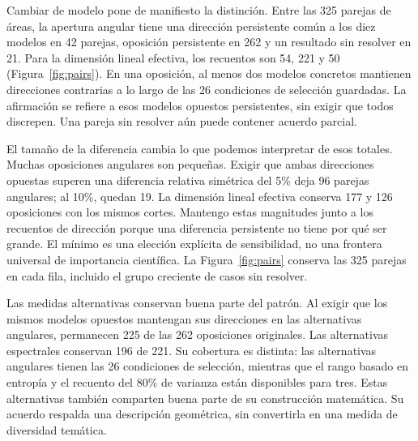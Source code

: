 \documentclass[12pt]{article}
\begin{document}
Cambiar de modelo pone de manifiesto la distinción. Entre las 325 parejas de áreas, la apertura angular tiene una dirección persistente común a los diez modelos en 42 parejas, oposición persistente en 262 y un resultado sin resolver en 21. Para la dimensión lineal efectiva, los recuentos son 54, 221 y 50 (Figura~\ref{fig:pairs}). En una oposición, al menos dos modelos concretos mantienen direcciones contrarias a lo largo de las 26 condiciones de selección guardadas. La afirmación se refiere a esos modelos opuestos persistentes, sin exigir que todos discrepen. Una pareja sin resolver aún puede contener acuerdo parcial.

El tamaño de la diferencia cambia lo que podemos interpretar de esos totales. Muchas oposiciones angulares son pequeñas. Exigir que ambas direcciones opuestas superen una diferencia relativa simétrica del 5\% deja 96 parejas angulares; al 10\%, quedan 19. La dimensión lineal efectiva conserva 177 y 126 oposiciones con los mismos cortes. Mantengo estas magnitudes junto a los recuentos de dirección porque una diferencia persistente no tiene por qué ser grande. El mínimo es una elección explícita de sensibilidad, no una frontera universal de importancia científica. La Figura~\ref{fig:pairs} conserva las 325 parejas en cada fila, incluido el grupo creciente de casos sin resolver.


Las medidas alternativas conservan buena parte del patrón. Al exigir que los mismos modelos opuestos mantengan sus direcciones en las alternativas angulares, permanecen 225 de las 262 oposiciones originales. Las alternativas espectrales conservan 196 de 221. Su cobertura es distinta: las alternativas angulares tienen las 26 condiciones de selección, mientras que el rango basado en entropía y el recuento del 80\% de varianza están disponibles para tres. Estas alternativas también comparten buena parte de su construcción matemática. Su acuerdo respalda una descripción geométrica, sin convertirla en una medida de diversidad temática.
\end{document}
